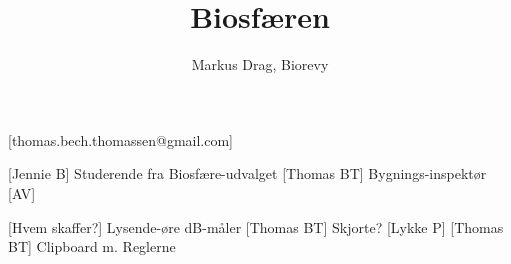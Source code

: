 \documentclass[a4paper,12pt]{article}
\title{Biosfæren}
\author{Markus Drag, Biorevy}
\begin{document}
\maketitle

\begin{texxers}
	[thomas.bech.thomassen@gmail.com]
\end{texxers}

\begin{roles}
	[Jennie B] Studerende fra Biosfære-udvalget
	[Thomas BT] Bygnings-inspektør
	[AV] 
\end{roles}


\begin{props}
[Hvem skaffer?] Lysende-øre dB-måler
 [Thomas BT] Skjorte?
[Lykke P]
[Thomas BT] Clipboard m. Reglerne
\end{props}
\end{document}
